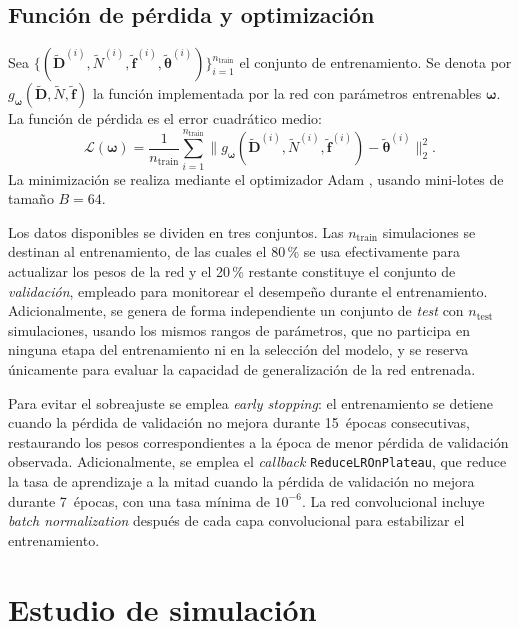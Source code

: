 \documentclass[a4paper,fleqn]{cas-sc}
\numberwithin{equation}{section}
\begin{document}
\subsection{Funci\'on de p\'erdida y optimizaci\'on}
\label{sec:loss}

Sea $\{(\tilde{\mathbf{D}}^{(i)}, \tilde{N}^{(i)}, \tilde{\mathbf{f}}^{(i)},
\tilde{\boldsymbol{\theta}}^{(i)})\}_{i=1}^{n_{\mathrm{train}}}$ el conjunto
de entrenamiento. Se denota por
$g_{\boldsymbol{\omega}}(\tilde{\mathbf{D}}, \tilde{N}, \tilde{\mathbf{f}})$
la funci\'on implementada por la red con par\'ametros entrenables
$\boldsymbol{\omega}$. La funci\'on de p\'erdida es el error cuadr\'atico
medio:
\begin{equation}
    \mathcal{L}(\boldsymbol{\omega}) = \frac{1}{n_{\mathrm{train}}}
    \sum_{i=1}^{n_{\mathrm{train}}}
    \bigl\|g_{\boldsymbol{\omega}}(\tilde{\mathbf{D}}^{(i)},
    \tilde{N}^{(i)}, \tilde{\mathbf{f}}^{(i)})
    - \tilde{\boldsymbol{\theta}}^{(i)}\bigr\|_2^2.
    \label{eq:loss}
\end{equation}
La minimizaci\'on se realiza mediante el optimizador Adam \citep{adam},
usando mini-lotes de tama\~no $B=64$.

Los datos disponibles se dividen en tres conjuntos. Las $n_{\mathrm{train}}$
simulaciones se destinan al entrenamiento, de las cuales el 80\,\% se usa
efectivamente para actualizar los pesos de la red y el 20\,\% restante
constituye el conjunto de \emph{validaci\'on}, empleado para monitorear
el desempe\~no durante el entrenamiento. Adicionalmente, se genera de
forma independiente un conjunto de \emph{test} con $n_{\mathrm{test}}$
simulaciones, usando los mismos rangos de par\'ametros, que no participa
en ninguna etapa del entrenamiento ni en la selecci\'on del modelo, y se
reserva \'unicamente para evaluar la capacidad de generalizaci\'on de la
red entrenada.

Para evitar el sobreajuste se emplea \emph{early stopping}: el
entrenamiento se detiene cuando la p\'erdida de validaci\'on no mejora
durante 15~\'epocas consecutivas, restaurando los pesos correspondientes
a la \'epoca de menor p\'erdida de validaci\'on observada. Adicionalmente,
se emplea el \emph{callback} \texttt{ReduceLROnPlateau}, que reduce la
tasa de aprendizaje a la mitad cuando la p\'erdida de validaci\'on no
mejora durante 7~\'epocas, con una tasa m\'inima de $10^{-6}$. La red
convolucional incluye \emph{batch normalization} despu\'es de cada capa
convolucional para estabilizar el entrenamiento.

\section{Estudio de simulaci\'on}
\label{sec:simulacion}
\end{document}
